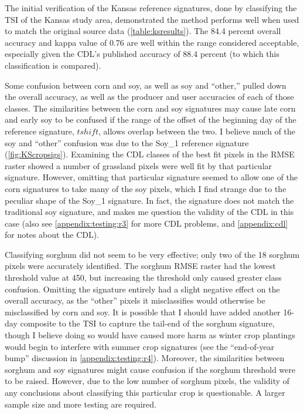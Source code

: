 The initial verification of the Kansas reference signatures, done by classifying the TSI of the Kansas study area, demonstrated the method performs well when used to match the original source data (\autoref{table:ksresults}). The 84.4 percent overall accuracy and kappa value of 0.76 are well within the range considered acceptable, especially given the CDL's published accuracy of 88.4 percent (to which this classification is compared).

Some confusion between corn and soy, as well as soy and ``other,'' pulled down the overall accuracy, as well as the producer and user accuracies of each of those classes. The similarities between the corn and soy signatures may cause late corn and early soy to be confused if the range of the offset of the beginning day of the reference signature, $tshift$, allows overlap between the two. I believe much of the soy and ``other'' confusion was due to the Soy\_1 reference signature (\autoref{fig:KScropsigs}). Examining the CDL classes of the best fit pixels in the RMSE raster showed a number of grassland pixels were well fit by that particular signature. However, omitting that particular signature seemed to allow one of the corn signatures to take many of the soy pixels, which I find strange due to the peculiar shape of the Soy\_1 signature. In fact, the signature does not match the traditional soy signature, and makes me question the validity of the CDL in this case (also see \autoref{appendix:testing:r3} for more CDL problems, and \autoref{appendix:cdl} for notes about the CDL).

Classifying sorghum did not seem to be very effective; only two of the 18 sorghum pixels were accurately identified. The sorghum RMSE raster had the lowest threshold value at 450, but increasing the threshold only caused greater class confusion. Omitting the signature entirely had a slight negative effect on the overall accuracy, as the ``other'' pixels it misclassifies would otherwise be misclassified by corn and soy. It is possible that I should have added another 16-day composite to the TSI to capture the tail-end of the sorghum signature, though I believe doing so would have caused more harm as winter crop plantings would begin to interfere with summer crop signatures (see the ``end-of-year bump'' discussion in \autoref{appendix:testing:r4}). Moreover, the similarities between sorghum and soy signatures might cause confusion if the sorghum threshold were to be raised. However, due to the low number of sorghum pixels, the validity of any conclusions about classifying this particular crop is questionable. A larger sample size and more testing are required.

